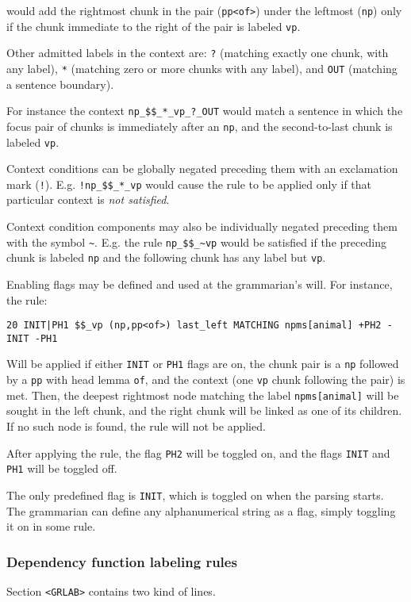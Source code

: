\documentclass[a4paper]{book}
\begin{document}
  would add the rightmost chunk in the pair (\verb#pp<of>#) under the
  leftmost (\verb#np#) only if the chunk immediate to the right of the pair
  is labeled \verb#vp#.

  Other admitted labels in the context are: \verb#?# (matching exactly
  one chunk, with any label), \verb#*# (matching zero or more chunks
  with any label), and \verb#OUT# (matching a sentence boundary).

  For instance the context \verb#np_$$_*_vp_?_OUT# would match a
  sentence in which the focus pair of chunks is immediately after an
  \verb#np#, and the second-to-last chunk is labeled \verb#vp#.

  Context conditions can be globally negated preceding them with an exclamation
  mark (\verb#!#). E.g. \verb#!np_$$_*_vp# would cause the rule to be applied only
  if that particular context is {\em not satisfied}.

  Context condition components may also be individually negated
  preceding them with the symbol \verb#~#. E.g. the rule
  \verb#np_$$_~vp# would be satisfied if the preceding chunk is
  labeled \verb#np# and the following chunk has any label but
  \verb#vp#.

  Enabling flags may be defined and used at the grammarian's will. 
  For instance, the rule:
\begin{verbatim}
20 INIT|PH1 $$_vp (np,pp<of>) last_left MATCHING npms[animal] +PH2 -INIT -PH1
\end{verbatim}

   Will be applied if either \verb#INIT# or \verb#PH1# flags are
   on, the chunk pair is a \verb#np# followed by a \verb#pp# with head
   lemma \verb#of#, and the context (one \verb#vp# chunk following the
   pair) is met. Then, the deepest rightmost node matching the label
   \verb#npms[animal]# will be sought in the left chunk, and the right
   chunk will be linked as one of its children. If no such node is found,
   the rule will not be applied. 
   
    After applying the rule, the flag \verb#PH2# will be toggled
    on, and the flags \verb#INIT# and \verb#PH1# will be toggled
    off.

    The only predefined flag is \verb#INIT#, which is toggled on when
    the parsing starts.  The grammarian can define any alphanumerical
    string as a flag, simply toggling it on in some rule.

\subsubsection{Dependency function labeling rules}
 Section \verb#<GRLAB># contains two kind of lines.
\end{document}
